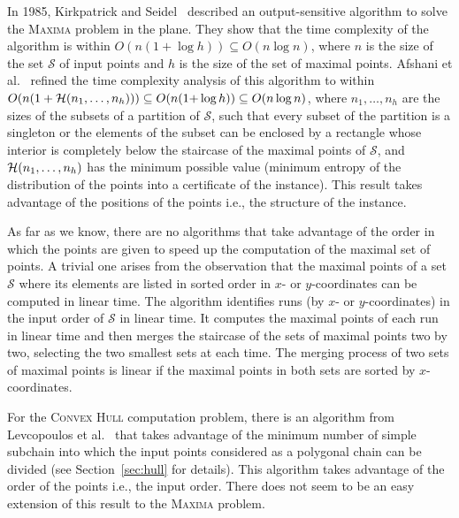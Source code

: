 In 1985, Kirkpatrick and
Seidel~\cite{1985-SOCG-OutputSizeSensitiveAlgorithmsForFindingMaximalVectors-KirkpatrickSeidel}
described an output-sensitive algorithm to solve the \textsc{Maxima}
problem in the plane. They show that the time complexity of the
algorithm is within $O(n(1+\log{h})) \subseteq O(n\log{n})$, where $n$ is
the size of the set $\mathcal{S}$ of input points and $h$ is the size
of the set of maximal points. Afshani et
al.~\cite{2009-FOCS-InstanceOptimalGeometricAlgorithms-AfshaniBarbayChan}
refined the time complexity analysis of this algorithm to within
$O(n(1+{\cal H}(n_1,\ldots,n_h)))\subseteq O(n(1{+}\log h)) \subseteq
O(n\log{n})$, where $n_1, \dots, n_h$ are the sizes of the subsets of
a partition of $\mathcal{S}$, such that every subset of the partition
is a singleton or the elements of the subset can be enclosed by a
rectangle whose interior is completely below the staircase of the
maximal points of $\mathcal{S}$, and ${\cal H}(n_1,\ldots,n_h)$ has
the minimum possible value (minimum entropy of the distribution of the
points into a certificate of the instance). This result takes
advantage of the positions of the points i.e., the structure of the
instance.


As far as we know, there are no algorithms that take advantage of the
order in which the points are given to speed up the computation of the
maximal set of points. A trivial one arises from the observation that
the maximal points of a set $\mathcal{S}$ where its elements are
listed in sorted order in $x$- or $y$-coordinates can be computed in
linear time. The algorithm identifies runs (by $x$- or
$y$-coordinates) in the input order of $\mathcal{S}$ in linear
time. It computes the maximal points of each run in linear time and
then merges the staircase of the sets of maximal points two by two,
selecting the two smallest sets at each time. The merging
process of two sets of maximal points is linear if the maximal points
in both sets are sorted by $x$-coordinates. 


For the \textsc{Convex Hull} computation problem, there is an
algorithm from Levcopoulos et
al.~\cite{2002-SWAT-AdaptiveAlgorithmsForConstructingConvexHullsAndTriangulationsOfPolygonalChains-LevcopoulosLingasMitchell}
that takes advantage of the minimum number of simple subchain into
which the input points considered as a polygonal chain can be divided
(see Section~\ref{sec:hull} for details). This algorithm takes
advantage of the order of the points i.e., the input order. There does
not seem to be an easy extension of this result to the \textsc{Maxima}
problem.


